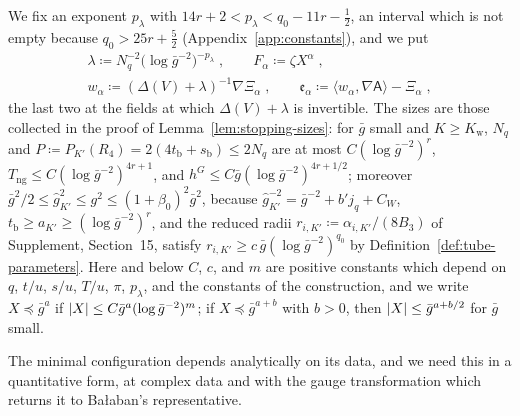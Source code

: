 \documentclass[11pt]{preprint}
\DeclarePairedDelimiter{\abs}{\lvert}{\rvert}
\numberwithin{equation}{section}
\theoremstyle{definition}
\theoremstyle{remark}
\theoremstyle{plain}
\begin{document}
We fix an exponent $p_\lambda$ with $14r + 2 < p_\lambda < q_0 - 11r - \frac12$, an interval which is not empty because $q_0 > 25r + \frac52$ (Appendix~\ref{app:constants}), and we put
\begin{equation}\label{eq:regularisation}
    \begin{gathered}
        \lambda \coloneqq N_q^{-2}\bigl(\log\bar g^{-2}\bigr)^{-p_\lambda}\;,
        \qquad
        F_\alpha \coloneqq \zeta X^\alpha\;,
        \\
        w_\alpha \coloneqq (\Delta(V) + \lambda)^{-1}\nabla\Xi_\alpha\;,
        \qquad
        \mathfrak e_\alpha \coloneqq \langle w_\alpha, \nabla\mathsf A\rangle - \Xi_\alpha\;,
    \end{gathered}
\end{equation}
the last two at the fields at which $\Delta(V) + \lambda$ is invertible. The sizes are those collected in the proof of Lemma~\ref{lem:stopping-sizes}: for $\bar g$ small and $K \geq K_{\mathrm w}$, $N_q$ and $P \coloneqq P_{K'}(R_4) = 2(4t_{\mathrm b} + s_{\mathrm b}) \leq 2N_q$ are at most $C(\log\bar g^{-2})^r$, $T_{\mathrm{ng}} \leq C(\log\bar g^{-2})^{4r+1}$, and $h^G \leq C\bar g(\log\bar g^{-2})^{4r+1/2}$; moreover $\bar g^2/2 \leq \hat g_{K'}^2 \leq g^2 \leq (1 + \beta_0)^2\bar g^2$, because $\hat g_{K'}^{-2} = \bar g^{-2} + b'j_q + C_W$, $t_{\mathrm b} \geq a_{K'} \geq (\log\bar g^{-2})^r$, and the reduced radii $r_{i,K'} \coloneqq \alpha_{i,K'}/(8B_3)$ of Supplement, Section~15, satisfy $r_{i,K'} \geq c\,\bar g(\log\bar g^{-2})^{q_0}$ by Definition~\ref{def:tube-parameters}. Here and below $C$, $c$, and $m$ are positive constants which depend on $q$, $t/u$, $s/u$, $T/u$, $\pi$, $p_\lambda$, and the constants of the construction, and we write $X \preceq \bar g^a$ if $\abs X \leq C\bar g^a(\log\bar g^{-2})^m$; if $X \preceq \bar g^{a+b}$ with $b > 0$, then $\abs X \leq \bar g^{a+b/2}$ for $\bar g$ small.

The minimal configuration depends analytically on its data, and we need this in a quantitative form, at complex data and with the gauge transformation which returns it to Ba{\l}aban's representative.
\end{document}
